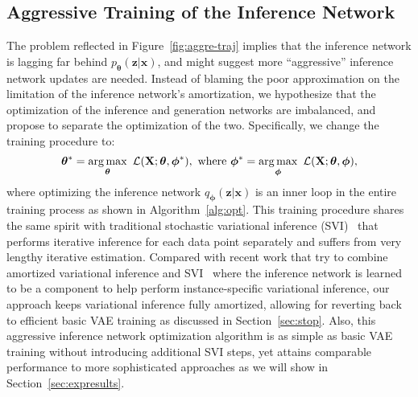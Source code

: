 \documentclass{article} \usepackage{iclr2019_conference,times}
\def\rvx{{\mathbf{x}}}
\def\rvz{{\mathbf{z}}}
\def\rmX{{\mathbf{X}}}
\def\vtheta{{\bm{\theta}}}
\def\vphi{{\bm{\phi}}}
\newcommand{\Ls}{\mathcal{L}}
\DeclareMathOperator*{\argmax}{arg\,max}
\newcommand{\qzx}{q_{\vphi}(\rvz|\rvx)}
\newcommand{\pzx}{p_{\vtheta}(\rvz|\rvx)}
\begin{document}
\subsection{Aggressive Training of the Inference Network}
The problem reflected in Figure~\ref{fig:aggre-traj} implies that the inference network is lagging far behind $\pzx$, and might suggest more ``aggressive'' inference network updates are needed.
Instead of blaming the poor approximation on the limitation of the inference network's amortization, we hypothesize that the optimization of the inference and generation networks are imbalanced, and propose to separate the optimization of the two.
Specifically, we change the training procedure to:
\begin{equation}
\label{eq:new-elbo}
\vspace{-2pt}
\vtheta^{\ast} = \argmax_{\vtheta} \ \Ls(\rmX; \vtheta, \vphi^{\ast}), \  \text{where} \ \vphi^{\ast} = \argmax_{\vphi} \ \Ls(\rmX; \vtheta, \vphi),
\vspace{-2pt}
\end{equation}
where optimizing the inference network $\qzx$ is an inner loop in the entire training process as shown in Algorithm~\ref{alg:opt}. This training procedure shares the same spirit with traditional stochastic variational inference (SVI)~\citep{hoffman2013stochastic} that performs iterative inference for each data point separately and suffers from very lengthy iterative estimation. Compared with recent work that try to combine amortized variational inference and SVI~\citep{hjelm2016iterative,krishnan2018challenges,kim2018semi,marino2018iterative} where the inference network is learned to be a component to help perform instance-specific variational inference, our approach keeps variational inference fully amortized, allowing for reverting back to efficient basic VAE training as discussed in Section~\ref{sec:stop}. Also, this aggressive inference network optimization algorithm is as simple as basic VAE training without introducing additional SVI steps, yet attains comparable performance to more sophisticated approaches as we will show in Section~\ref{sec:expresults}.
\end{document}
